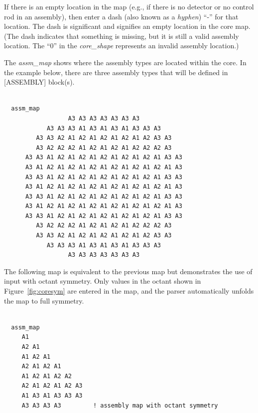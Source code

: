 If there is an empty location in the map (e.g., if there is no detector or no control rod
in an assembly), then enter a dash (also known as a \textit{hyphen}) ``-'' for that location. The dash is significant and signifies an
empty location in the core map. (The dash indicates that something is missing, but it is still
a valid assembly location. The ``0'' in the {\it core\_shape} represents an invalid assembly location.)


\clearpage

The {\it assm\_map} shows where the assembly types are located within the core.
In the example below, there are three assembly types that will be defined in [ASSEMBLY] block(s).
\begin{Verbatim}[fontsize=\small]

  assm_map
                  A3 A3 A3 A3 A3 A3 A3
            A3 A3 A3 A1 A3 A1 A3 A1 A3 A3 A3
         A3 A3 A2 A1 A2 A1 A2 A1 A2 A1 A2 A3 A3
         A3 A2 A2 A2 A1 A2 A1 A2 A1 A2 A2 A2 A3
      A3 A3 A1 A2 A1 A2 A1 A2 A1 A2 A1 A2 A1 A3 A3
      A3 A1 A2 A1 A2 A1 A2 A1 A2 A1 A2 A1 A2 A1 A3
      A3 A3 A1 A2 A1 A2 A1 A2 A1 A2 A1 A2 A1 A3 A3
      A3 A1 A2 A1 A2 A1 A2 A1 A2 A1 A2 A1 A2 A1 A3
      A3 A3 A1 A2 A1 A2 A1 A2 A1 A2 A1 A2 A1 A3 A3
      A3 A1 A2 A1 A2 A1 A2 A1 A2 A1 A2 A1 A2 A1 A3
      A3 A3 A1 A2 A1 A2 A1 A2 A1 A2 A1 A2 A1 A3 A3
         A3 A2 A2 A2 A1 A2 A1 A2 A1 A2 A2 A2 A3
         A3 A3 A2 A1 A2 A1 A2 A1 A2 A1 A2 A3 A3
            A3 A3 A3 A1 A3 A1 A3 A1 A3 A3 A3
                  A3 A3 A3 A3 A3 A3 A3

\end{Verbatim}

The following map is equivalent to the previous map but demonstrates the use of input with octant symmetry.
Only values in the octant shown in Figure~\ref{fig:coresym} are entered in the map, and the parser automatically
unfolds the map to full symmetry.
\begin{Verbatim}[fontsize=\small]

  assm_map
     A1
     A2 A1
     A1 A2 A1
     A2 A1 A2 A1
     A1 A2 A1 A2 A2
     A2 A1 A2 A1 A2 A3
     A1 A3 A1 A3 A3 A3
     A3 A3 A3 A3         ! assembly map with octant symmetry

\end{Verbatim}

